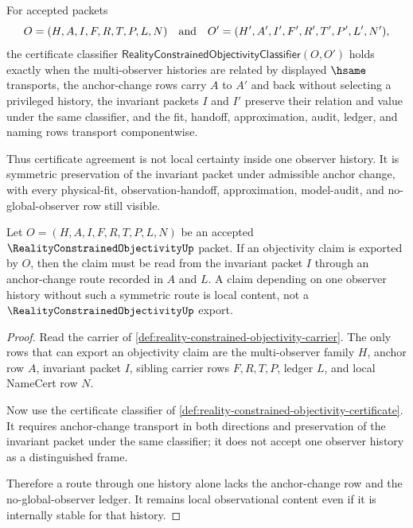 \begin{definition}
\label{def:reality-constrained-objectivity-certificate}
For accepted packets
$$
O=(H,A,I,F,R,T,P,L,N)
\quad\hbox{and}\quad
O'=(H',A',I',F',R',T',P',L',N'),
$$
the certificate classifier $\mathsf{RealityConstrainedObjectivityClassifier}(O,O')$ holds exactly when the multi-observer histories are related by displayed $\hsame$ transports, the anchor-change rows carry $A$ to $A'$ and back without selecting a privileged history, the invariant packets $I$ and $I'$ preserve their relation and value under the same classifier, and the fit, handoff, approximation, audit, ledger, and naming rows transport componentwise.

Thus certificate agreement is not local certainty inside one observer history. It is symmetric preservation of the invariant packet under admissible anchor change, with every physical-fit, observation-handoff, approximation, model-audit, and no-global-observer row still visible.
\end{definition}

\begin{theorem}
\label{thm:reality-constrained-objectivity-anchor-stability}
Let $O=(H,A,I,F,R,T,P,L,N)$ be an accepted $\RealityConstrainedObjectivityUp$ packet. If an objectivity claim is exported by $O$, then the claim must be read from the invariant packet $I$ through an anchor-change route recorded in $A$ and $L$. A claim depending on one observer history without such a symmetric route is local content, not a $\RealityConstrainedObjectivityUp$ export.
\end{theorem}
\begin{proof}
Read the carrier of \autoref{def:reality-constrained-objectivity-carrier}. The only rows that can export an objectivity claim are the multi-observer family $H$, anchor row $A$, invariant packet $I$, sibling carrier rows $F,R,T,P$, ledger $L$, and local NameCert row $N$.

Now use the certificate classifier of \autoref{def:reality-constrained-objectivity-certificate}. It requires anchor-change transport in both directions and preservation of the invariant packet under the same classifier; it does not accept one observer history as a distinguished frame.

Therefore a route through one history alone lacks the anchor-change row and the no-global-observer ledger. It remains local observational content even if it is internally stable for that history.
\end{proof}


